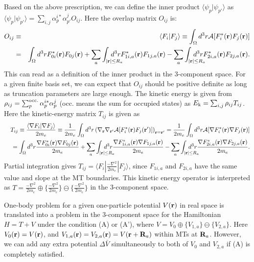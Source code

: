 \documentclass[a4paper,10pt,aip,onecolumn,amsmath,amssymb,floatfix,rmp]{revtex4-1}
\newcommand{\bfr}{{\bf r}}
\newcommand{\bfR}{{\bf R}}
\def\calR{{\cal A}}
\def\inta{\int_{|\bfr|\leq R_a}\!\!\!\!\!\!\!\!\!\!\!\!}
\def\ek{E_{\rm k}}
\begin{document}
\begin{widetext}
Based on the above prescription, we can define the inner product 
$\langle \psi_p |\psi_{p'} \rangle$ as $\langle \psi_p |\psi_{p'}
\rangle=\sum_{i,j}\alpha_{p}^{i*}\alpha_{p'}^{j}O_{ij}$.
Here the overlap matrix  $O_{ij}$ is:
\begin{eqnarray}
O_{ij} &\equiv& \langle F_i|F_{j} \rangle \equiv \int_\Omega d^3r 
  \calR[F^*_i(\bfr)F_j(\bfr)] \nonumber \\
&=&\int_\Omega d^3r  F^*_{0i}(\bfr)F_{0j}(\bfr)
  + \sum_a \inta d^3r  F^*_{1i,a}(\bfr)F_{1j,a}(\bfr) 
  - \sum_a \inta d^3r  F^*_{2i,a}(\bfr)F_{2j,a}(\bfr).  \label{eq:norm} 
\end{eqnarray}
This can read as a definition of the inner product in the 3-component space.
For a given finite basis set, we can expect that $O_{ij}$ should be
positive definite as long as truncation parameters are large enough.
The kinetic energy is given 
from $\rho_{ij}=\sum_{p}^{\rm occ.} \alpha^{i*}_p \alpha^j_p$ (occ. means
the sum for occupied states) as $\ek=\sum_{i,j} \rho_{ij} T_{ij}$.
Here the kinetic-energy matrix $T_{ij}$ is given as
\begin{eqnarray}
&&T_{ij}\equiv \frac{\langle \nabla F_i| \nabla F_{j} \rangle}{2m_e}
 \equiv \frac{1}{2m_e} \int_\Omega d^3r \left(\nabla_\bfr \nabla_{\bfr'}
 \calR[F^*_i(\bfr)F_j(\bfr')]\right)_{\bfr=\bfr'} 
=\frac{1}{2m_e} \int_\Omega d^3r 
\calR[\nabla F^*_i(\bfr) \nabla F_j(\bfr)] \nonumber \\
&&= \int_\Omega d^3r \frac{\nabla F^*_{0i}(\bfr) \nabla F_{0j}(\bfr)}{2m_e} 
+ \sum_a \inta d^3r \frac{\nabla F^*_{1i,a}(\bfr) \nabla F_{1j,a}(\bfr)}{2m_e}
- \sum_a \inta d^3r \frac{\nabla F^*_{2i,a}(\bfr) \nabla F_{2j,a}(\bfr)}{2m_e}.
\label{eq:kin}
\end{eqnarray}
Partial integration gives $T_{ij}= \langle F_i| \frac{-\nabla^2 }{2m_e}|F_{j} \rangle$, 
since $F_{1i,a}$ and $F_{2i,a}$ have the same value and slope at the MT boundaries.
This kinetic energy operator is interpreted as $T=\frac{-\nabla^2 }{2m_e} \oplus
\{\frac{-\nabla^2 }{2m_e} \} \ominus  \{\frac{-\nabla^2 }{2m_e} \}$ in the 3-component space.

One-body problem for a given one-particle potential $V(\bfr)$ in real
space is translated into a problem in the 3-component space for the
Hamiltonian $H=T+V$ under the condition (A) or (A'), where $V=V_0 \oplus
\{V_{1,a}\} \ominus \{V_{2,a}\}$.  Here $V_0(\bfr)=V(\bfr)$, and
$V_{1,a}(\bfr)=V_{2,a}(\bfr)=V(\bfr+\bfR_a)$ within MTs at
$\bfR_a$. However, we can add any extra potential $\Delta \bar{V}$
simultaneously to both of $V_0$ and $V_{2,a}$ if (A) is completely
satisfied.


\end{widetext}
\end{document}
